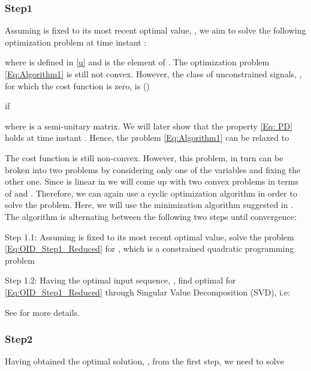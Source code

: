 \documentclass{ifacconf}
\begin{document}
\subsubsection{Step1} \label{Algorithm1}
Assuming  is fixed to its most recent optimal value, , we aim to solve the following optimization problem at time instant :
\vspace{-0.3cm}

where  is defined in \eqref{u} and  is the  element of .
The optimization problem \eqref{Eq:Algorithm1} is still not convex. However, the class of unconstrained signals, , for which the cost function is zero, is (\cite{stoica2007})

if

where  is a semi-unitary matrix. We will later show that the property \eqref{Eq: PD} holds at time instant . Hence, the problem \eqref{Eq:Algorithm1} can be relaxed to
\vspace{-0.3cm}

The cost function is still non-convex. However, this problem, in turn can be broken into two problems by considering only one of the variables and fixing the other one. Since  is linear in  we will come up with two convex problems in terms of  and . Therefore, we can again use a cyclic optimization algorithm in order to solve the problem. Here, we will use the minimization algorithm suggested in \cite{stoica2007}. The algorithm is alternating between the following two steps until convergence:
\begin{description}
\item{Step 1.1}: Assuming  is fixed to its most recent optimal value, solve the problem \eqref{Eq:OID_Step1_Reduced} for , which is a constrained quadratic programming problem
\vspace{-0.2cm}

\item{Step 1.2}: Having the optimal input sequence, , find optimal  for \eqref{Eq:OID_Step1_Reduced} through Singular Value Decomposition (SVD), i.e:
\vspace{-0.1cm}

See \cite{stoica2007} for more details.
\end{description}
\subsubsection{Step2}\label{Step2}
Having obtained the optimal solution, , from the first step, we need to solve
\vspace{-0.2cm}
\end{document}
